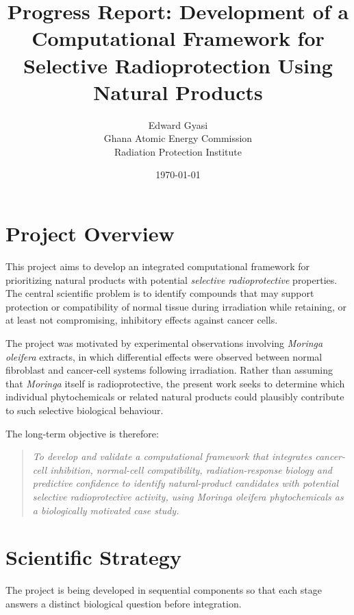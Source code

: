 \documentclass[11pt,a4paper]{article}
\title{\textbf{Progress Report: Development of a Computational Framework for Selective Radioprotection Using Natural Products}}
\author{
Edward Gyasi\\
Ghana Atomic Energy Commission\\
Radiation Protection Institute
}
\date{\today}
\begin{document}
\maketitle

\section{Project Overview}

This project aims to develop an integrated computational framework for prioritizing natural products with potential \textit{selective radioprotective} properties. The central scientific problem is to identify compounds that may support protection or compatibility of normal tissue during irradiation while retaining, or at least not compromising, inhibitory effects against cancer cells.

The project was motivated by experimental observations involving \textit{Moringa oleifera} extracts, in which differential effects were observed between normal fibroblast and cancer-cell systems following irradiation. Rather than assuming that \textit{Moringa} itself is radioprotective, the present work seeks to determine which individual phytochemicals or related natural products could plausibly contribute to such selective biological behaviour.

The long-term objective is therefore:

\begin{quote}
\textit{To develop and validate a computational framework that integrates cancer-cell inhibition, normal-cell compatibility, radiation-response biology and predictive confidence to identify natural-product candidates with potential selective radioprotective activity, using \textit{Moringa oleifera} phytochemicals as a biologically motivated case study.}
\end{quote}

\section{Scientific Strategy}

The project is being developed in sequential components so that each stage answers a distinct biological question before integration.
\end{document}
